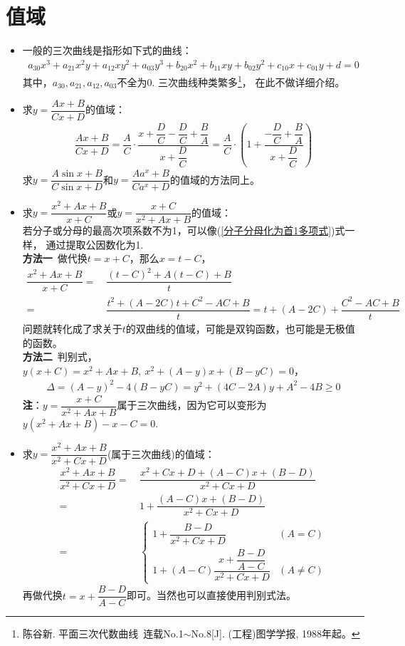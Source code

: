 \section{值域} 
\begin{itemize}[leftmargin=\inteval{\myitemleftmargin}pt,itemsep=
   \inteval{\myitemitempsep}pt,topsep=\inteval{\myitemtopsep}pt]
\item 一般的三次曲线是指形如下式的曲线：
\begin{gather*}
    a_{30}x^3+a_{21}x^2y+a_{12}xy^2+a_{03}y^3+b_{20}x^2+b_{11}xy+b_{02}y^2+
    c_{10}x+c_{01}y+d=0
\end{gather*}
其中，$ a_{30},a_{21},a_{12},a_{03} $不全为0. 三次曲线种类繁多\footnote{陈谷新. 
    平面三次代数曲线\ 连载No.1$ \sim $No.8[J]. (工程)图学学报, 1988年起。}，
在此不做详细介绍。

\item 求$ y=\dfrac{Ax+B}{Cx+D} $的值域：
\begin{align}\label{分子分母化为首1多项式}
    \dfrac{Ax+B}{Cx+D} =
    \dfrac{A}{C}\cdot\dfrac{x+\dfrac{D}{C}-\dfrac{D}{C}+\dfrac{B}{A}}
    {x+\dfrac{D}{C}}=\dfrac{A}{C}\cdot
    \left(1+\dfrac{-\dfrac{D}{C}+\dfrac{B}{A}}{x+\dfrac{D}{C}}\right)
\end{align}
求$ y=\dfrac{A\sin x+B}{C\sin x+D}$和$ y=\dfrac{Aa^x+B}{Ca^x+D}$的值域的方法同上。

\item 求$ y=\dfrac{x^2+Ax+B}{x+C} $或$ y=\dfrac{x+C}{x^2+Ax+B} $的值域：\\
若分子或分母的最高次项系数不为1，可以像(\ref{分子分母化为首1多项式})式一样，
通过提取公因数化为1. \\
\textbf{方法一}\ 做代换$ t=x+C $，那么$ x=t-C $，
\begin{align*}
    \dfrac{x^2+Ax+B}{x+C}=&\ \dfrac{(t-C)^2+A(t-C)+B}{t}\\
    =&\ \dfrac{t^2+(A-2C)t+C^2-AC+B}{t}=t+(A-2C)+\dfrac{C^2-AC+B}{t}
\end{align*}
问题就转化成了求关于$ t $的双曲线的值域，可能是双钩函数，也可能是无极值的函数。\\
\textbf{方法二}\ 判别式，$ y(x+C)=x^2+Ax+B,\ x^2+(A-y)x+(B-yC)=0 $，
\begin{align*}
    \Delta=(A-y)^2-4(B-yC)=y^2+(4C-2A)y+A^2-4B\geq 0 
\end{align*}
\textbf{注}：$ y=\dfrac{x+C}{x^2+Ax+B} $属于三次曲线，因为它可以变形为$ y(x^2+Ax+B)-x-C=0 $. 

\item 求$ y=\dfrac{x^2+Ax+B}{x^2+Cx+D} $(属于三次曲线)的值域：
\begin{align*}
    \dfrac{x^2+Ax+B}{x^2+Cx+D} =&\  \dfrac{x^2+Cx+D+(A-C)x+(B-D)}{x^2+Cx+D} \\
    =&\ 1+\dfrac{(A-C)x+(B-D)}{x^2+Cx+D}  \\
    =&\ \begin{cases}
         1+\dfrac{B-D}{x^2+Cx+D} & (A = C) \\
         1+(A-C)\dfrac{x+\dfrac{B-D}{A-C}}{x^2+Cx+D} & (A\neq C)
    \end{cases}
\end{align*}
再做代换$ t=x+\dfrac{B-D}{A-C} $即可。当然也可以直接使用判别式法。


\end{itemize}
